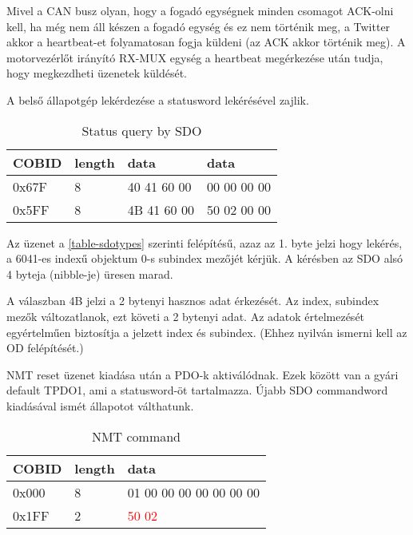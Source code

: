 Mivel a CAN busz olyan, hogy a fogadó egységnek minden csomagot ACK-olni kell, ha még nem áll készen a fogadó egység és ez nem történik meg, a Twitter akkor a heartbeat-et folyamatosan fogja küldeni (az ACK akkor történik meg). A motorvezérlőt irányító RX-MUX egység a heartbeat megérkezése után tudja, hogy megkezdheti üzenetek küldését.

A belső állapotgép lekérdezése a statusword lekérésével zajlik.



\begin{table}[H]
	\centering
	\renewcommand{\arraystretch}{2} %
	
	\begin{tabu}{|p{1.3cm}|p{1cm}|p{2cm}|p{2cm}|}
		\hline
		COBID & length & data & data
		\\ 		\hline
		0x67F & 8 & 40 41 60 00 & 00 00 00 00
		\\		\hline
		0x5FF & 8 & 4B 41 60 00 & 50 02 00 00
		\\		\hline
	\end{tabu}
	\caption*{Status query by SDO}
\end{table}

\begin{formal}
	Az üzenet a \ref{table-sdotypes} szerinti felépítésű, azaz az 1. byte jelzi hogy lekérés, a 6041-es indexű objektum 0-s subindex mezőjét kérjük. A kérésben az SDO alsó 4 byteja (nibble-je) üresen marad.
	
	A válaszban 4B jelzi a 2 bytenyi hasznos adat érkezését. Az index, subindex mezők változatlanok, ezt követi a 2 bytenyi adat. Az adatok értelmezését egyértelműen biztosítja a jelzett index és subindex. (Ehhez nyilván ismerni kell az OD felépítését.)
\end{formal}


NMT reset üzenet kiadása után a PDO-k aktiválódnak. Ezek között van a gyári default TPDO1, ami a statusword-öt tartalmazza. Újabb SDO commandword kiadásával ismét állapotot válthatunk.


\begin{table}[H]
	\centering
	\renewcommand{\arraystretch}{2} %
	
	\begin{tabu}{|p{1.3cm}|p{1cm}|p{4cm}|}
		\hline
		COBID & length & data
		\\ 		\hline
		0x000 & 8 & 01 00 00 00 00 00 00 00
		\\		\hline
		0x1FF & 2 & \textcolor{red}{50 02}
		\\		\hline
	\end{tabu}
	\caption*{NMT command}
\end{table}

